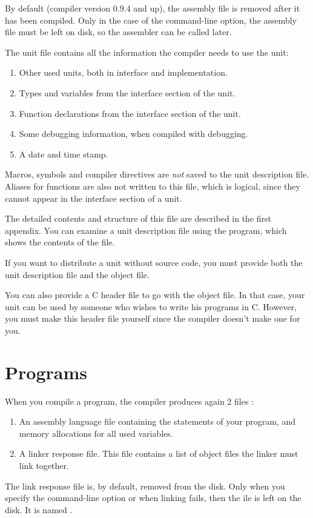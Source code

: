 \documentclass{report}
\begin{document}
By default (compiler version 0.9.4 and up), the assembly file is removed
after it has been compiled. Only in the case of the  command-line
option, the assembly file must be left on disk, so the assembler can be
called later. 

The unit file contains all the information the compiler needs to use the
unit:
\begin{enumerate}
\item Other used units, both in interface and implementation.
\item Types and variables from the interface section of the unit.
\item Function declarations from the interface section of the unit.
\item Some debugging information, when compiled with debugging.
\item A date and time stamp.
\end{enumerate}
Macros, symbols and compiler directives are {\em not} saved to the unit
description file. Aliases for functions are also not written to this file,
which is logical, since they cannot appear in the interface section of a
unit.

The detailed contents and structure of this file are described in the first 
appendix. You can examine a unit description file using the 
program, which shows the contents of the file.

If you want to distribute a unit without source code, you must provide both
the unit description file and the object file. 

You can also provide a C header file to go with the object file. In that
case, your unit can be used by someone who wishes to write his programs in
C. However, you must make this header file yourself since the \fpc compiler
doesn't make one for you.

\section{Programs}
\label{se:Programs}

When you compile a program, the compiler produces again 2 files :
\begin{enumerate}
\item An assembly language file containing the statements of your program,
and memory allocations for all used variables.
\item A linker response file. This file contains a list of object files the
linker must link together. 
\end{enumerate}
The link response file is, by default, removed from the disk. Only when you
specify the  command-line option or when linking fails, then the ile
is left on the disk. It is named .
\end{document}
